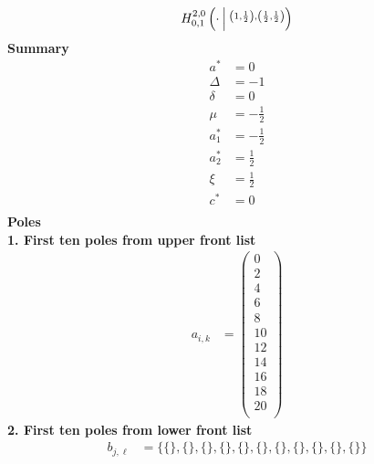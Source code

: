 \documentclass{article}
\newcommand{\FoxH}[5]{H_{#2}^{#1}\left(#3\:\middle\vert\: \begin{subarray}{l}#4\\[0.4em] #5\end{subarray}\right)}
\begin{document}
\begin{align*}
\FoxH{2,0}{0,1}{\cdot}{\left(1, \frac{1}{2}\right), \left(\frac{1}{2}, \frac{1}{2}\right)}{}
\end{align*}
\noindent\textbf{Summary}
\begin{align*}
a^* &= 0 \\
\Delta &= -1 \\
\delta &= 0 \\
\mu &= -\frac{1}{2} \\
a_1^* &= -\frac{1}{2} \\
a_2^* &= \frac{1}{2} \\
\xi &= \frac{1}{2} \\
c^* &= 0 \\
\end{align*}
\noindent\textbf{Poles}\\
\noindent\textbf{1. First ten poles from upper front list}
\begin{align*}
a_{i,k} &= \left(
\begin{array}{c}
 0 \\
 2 \\
 4 \\
 6 \\
 8 \\
 10 \\
 12 \\
 14 \\
 16 \\
 18 \\
 20 \\
\end{array}
\right)
\end{align*}
\noindent\textbf{2. First ten poles from lower front list}
\begin{align*}
b_{j,\ell} &= \{\{\},\{\},\{\},\{\},\{\},\{\},\{\},\{\},\{\},\{\},\{\}\}
\end{align*}
\end{document}
